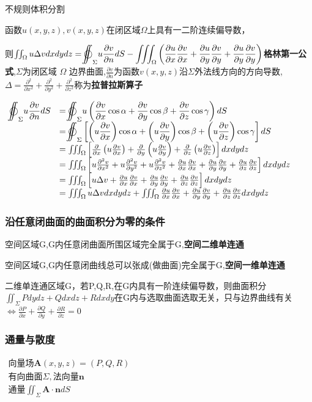 \documentclass[UTF8]{ctexart}
\newcommand{\mt}[1]{\text{#1}}
\newcommand{\mb}[1]{\textbf{#1}}
\newcommand{\mf}[1]{\left( #1\right)}
\newcommand{\mfc}[1]{\left[ #1 \right]}
\newcommand{\p}{\par}
\newcommand{\ma}[1]{\begin{array}{llll} #1 \end{array}}
\newcommand{\da}[2]{\frac{\partial #1}{\partial #2}}
\def\ooint{\displaystyle{{\bigcirc}\kern-12.5pt{\int}\kern-7.5pt{\int}}}
\begin{document}
不规则体积分割\p


函数$u\mf{x,y,z},v\mf{x,y,z}$在闭区域$\Omega$上具有一二阶连续偏导数，

则$\iint_\Omega u \Delta vdxdydz=\ooint_{\Sigma}u\da{v}{n}dS-\iiint_{\Omega}\mf{
    \da{u}{x}\da{v}{x}+\da{u}{y}\da{v}{y}+\da{u}{y}\da{v}{y}
}$\mb{格林第一公式},$\Sigma$为闭区域 $\Omega$ 边界曲面,$\da{v}{n}$为函数$v\mf{x,y,z}$沿$\Sigma$外法线方向的方向导数,$\Delta=\da{^2}{x^2}+\da{^2}{y^2}+\da{^2}{z^2}$称为\mb{拉普拉斯算子}

$\ma{\ooint_{\Sigma}u\da{v}{n}dS&=\ooint_\Sigma u\mf{\da{v}{x}\cos \alpha + \da{v}{y}\cos \beta +\da{v}{z}\cos \gamma }dS\\
    &=\ooint_{\Sigma}\mfc{ \mf{u\da{v}{x}}\cos \alpha  + \mf{u\da{v}{y}}\cos \beta +\mf{u\da{v}{z}}\cos \gamma   }dS\\
    &=\iiint_{\Omega}\mfc{ \da{}{x}\mf{u\da{v}{x}}  + \da{}{y}\mf{u\da{v}{y}}+\da{}{z}\mf{u\da{v}{z}} }dxdydz\\
    &=\iiint_{\Omega}\mfc{ u\da{^2v}{x^2}+u\da{^2v}{y^2}+u\da{^2v}{z^2}+\da{u}{x}\da{v}{x}+\da{u}{y}\da{v}{y} + \da{u}{z}\da{v}{z}}dxdydz\\
    &=\iiint_{\Omega}\mfc{ u\Delta v +\da{u}{x}\da{v}{x}+\da{u}{y}\da{v}{y} + \da{u}{z}\da{v}{z}}dxdydz\\
    &=\iiint_{\Omega} u\Delta vdxdydz+\iiint_{\Omega} \da{u}{x}\da{v}{x}+\da{u}{y}\da{v}{y} + \da{u}{z}\da{v}{z}dxdydz
}$



\subsubsection{沿任意闭曲面的曲面积分为零的条件}

空间区域G,G内任意闭曲面所围区域完全属于G,\mb{空间二维单连通}

空间区域G,G内任意闭曲线总可以张成(做曲面)完全属于G,\mb{空间一维单连通}

二维单连通区域G，若P,Q,R,在G内具有一阶连续偏导数，则曲面积分 $\iint_\Sigma Pdydz +Qdxdz+Rdxdy$在G内与选取曲面选取无关，只与边界曲线有关$\Leftrightarrow \da{P}{x}+\da{Q}{y}+\da{R}{z}=0$


\subsubsection{通量与散度}
$\ma{
    \mt{向量场}\mb{A}\mf{x,y,z}=\mf{P,Q,R}\\
    \mt{有向曲面}\Sigma,\mt{法向量}\mb{n}\\
    \mt{通量}\iint_\Sigma \mb{A}\cdot \mb{n} dS
}$
\end{document}
